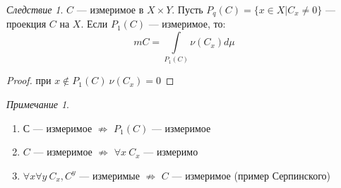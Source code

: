 \documentclass[oneside]{book}
\theoremstyle{plain}
\theoremstyle{remark}
\newtheorem*{remark}{Примечание}
\newtheorem{corollary}{Следствие}[theorem]
\theoremstyle{definition}
\begin{document}
\begin{corollary}
\(C\) --- измеримое в \(X\times Y\). Пусть \(P_q(C) = \{x \in X| C_x \neq 0\}\) --- проекция \(C\) на \(X\). Если \(P_1(C)\) --- измеримое, то:
\[ mC = \int\limits_{P_1(C)} \nu(C_x) d\mu \]
\end{corollary}
\begin{proof}
при \(x \not\in P_1(C)\ \nu(C_x) = 0\)
\end{proof}
\begin{remark}
\-
\begin{enumerate}
\item \(С\) --- измеримое \(\not\Rightarrow\) \(P_1(C)\) --- измеримое
\item \(C\) --- измеримое \(\not\Rightarrow\) \(\forall x\ C_x\) --- измеримо
\item \(\forall x\forall y\ C_x,C^y\) --- измеримые \(\not\Rightarrow\) \(C\) --- измеримое (пример Серпинского)
\end{enumerate}
\end{remark}
\end{document}
